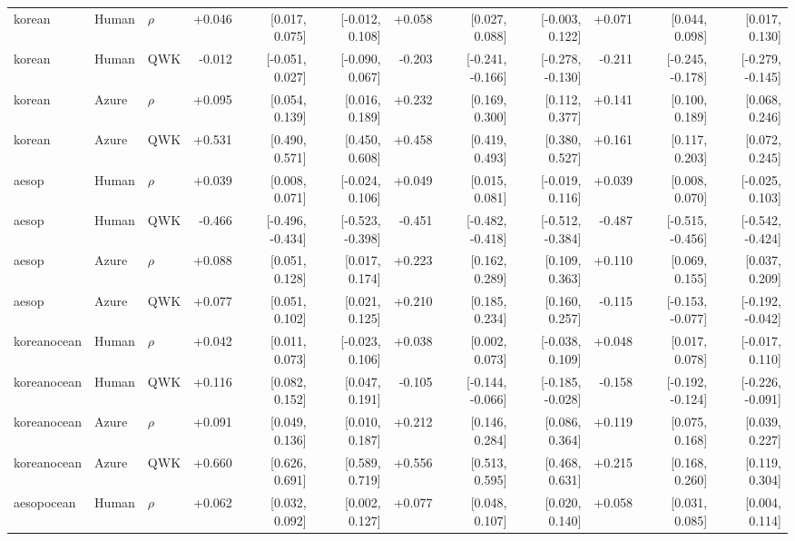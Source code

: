 \begin{landscape}
\begin{longtable}{@{}lllrrrrrrrrr@{}}
\addlinespace[2pt]
korean & Human & $\rho$ & +0.046 & [0.017, 0.075] & [-0.012, 0.108] & +0.058 & [0.027, 0.088] & [-0.003, 0.122] & +0.071 & [0.044, 0.098] & [0.017, 0.130]\\
korean & Human & QWK & -0.012 & [-0.051, 0.027] & [-0.090, 0.067] & -0.203 & [-0.241, -0.166] & [-0.278, -0.130] & -0.211 & [-0.245, -0.178] & [-0.279, -0.145]\\
korean & Azure & $\rho$ & +0.095 & [0.054, 0.139] & [0.016, 0.189] & +0.232 & [0.169, 0.300] & [0.112, 0.377] & +0.141 & [0.100, 0.189] & [0.068, 0.246]\\
korean & Azure & QWK & +0.531 & [0.490, 0.571] & [0.450, 0.608] & +0.458 & [0.419, 0.493] & [0.380, 0.527] & +0.161 & [0.117, 0.203] & [0.072, 0.245]\\
\addlinespace[2pt]
aesop & Human & $\rho$ & +0.039 & [0.008, 0.071] & [-0.024, 0.106] & +0.049 & [0.015, 0.081] & [-0.019, 0.116] & +0.039 & [0.008, 0.070] & [-0.025, 0.103]\\
aesop & Human & QWK & -0.466 & [-0.496, -0.434] & [-0.523, -0.398] & -0.451 & [-0.482, -0.418] & [-0.512, -0.384] & -0.487 & [-0.515, -0.456] & [-0.542, -0.424]\\
aesop & Azure & $\rho$ & +0.088 & [0.051, 0.128] & [0.017, 0.174] & +0.223 & [0.162, 0.289] & [0.109, 0.363] & +0.110 & [0.069, 0.155] & [0.037, 0.209]\\
aesop & Azure & QWK & +0.077 & [0.051, 0.102] & [0.021, 0.125] & +0.210 & [0.185, 0.234] & [0.160, 0.257] & -0.115 & [-0.153, -0.077] & [-0.192, -0.042]\\
\addlinespace[2pt]
koreanocean & Human & $\rho$ & +0.042 & [0.011, 0.073] & [-0.023, 0.106] & +0.038 & [0.002, 0.073] & [-0.038, 0.109] & +0.048 & [0.017, 0.078] & [-0.017, 0.110]\\
koreanocean & Human & QWK & +0.116 & [0.082, 0.152] & [0.047, 0.191] & -0.105 & [-0.144, -0.066] & [-0.185, -0.028] & -0.158 & [-0.192, -0.124] & [-0.226, -0.091]\\
koreanocean & Azure & $\rho$ & +0.091 & [0.049, 0.136] & [0.010, 0.187] & +0.212 & [0.146, 0.284] & [0.086, 0.364] & +0.119 & [0.075, 0.168] & [0.039, 0.227]\\
koreanocean & Azure & QWK & +0.660 & [0.626, 0.691] & [0.589, 0.719] & +0.556 & [0.513, 0.595] & [0.468, 0.631] & +0.215 & [0.168, 0.260] & [0.119, 0.304]\\
\addlinespace[2pt]
aesopocean & Human & $\rho$ & +0.062 & [0.032, 0.092] & [0.002, 0.127] & +0.077 & [0.048, 0.107] & [0.020, 0.140] & +0.058 & [0.031, 0.085] & [0.004, 0.114]\\

\end{longtable}
\end{landscape}
